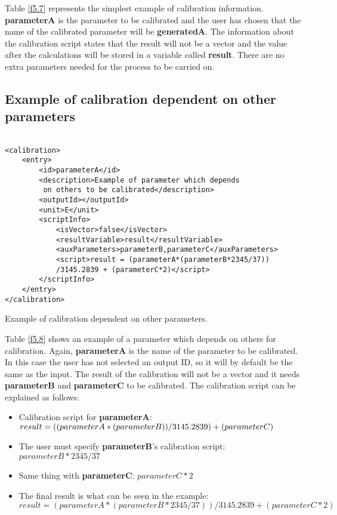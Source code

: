 Table \ref{f5.7} represents the simplest example of calibration information. \textbf{parameterA} is the parameter to be calibrated and the user has chosen that the name of the calibrated parameter will be \textbf{generatedA}. The information about the calibration script states that the result will not be a vector and the value after the calculations will be stored in a variable called \textbf{result}. There are no extra parameters needed for the process to be carried on.

\subsection{Example of calibration dependent on other parameters}

\begin{table}[H]
\lstset{language=XML}
\begin{lstlisting}

<calibration>
	<entry>
		<id>parameterA</id>
		<description>Example of parameter which depends
		 on others to be calibrated</description>
		<outputId></outputId>
		<unit>E</unit>
		<scriptInfo>
			<isVector>false</isVector>
			<resultVariable>result</resultVariable>
			<auxParameters>parameterB,parameterC</auxParameters>
			<script>result = (parameterA*(parameterB*2345/37))
			/3145.2839 + (parameterC*2)</script>
		</scriptInfo>
	</entry>
</calibration>
\end{lstlisting}
\caption{Example of calibration dependent on other parameters.}
\label{Table5.8}
\end{table}

Table \ref{f5.8} shows an example of a parameter which depends on others for calibration. Again, \textbf{parameterA} is the name of the parameter to be calibrated. In this case the user has not selected an output ID, so it will by default be the same as the input. The result of the calibration will not be a vector and it needs \textbf{parameterB} and \textbf{parameterC} to be calibrated. The calibration script can be explained as follows:
\begin{itemize}
\item Calibration script for \textbf{parameterA}: $result = ((parameterA*(parameterB))\\			/3145.2839) + (parameterC)$
\item The user must specify \textbf{parameterB}'s calibration script: $parameterB*2345/37$
\item Same thing with \textbf{parameterC}: $parameterC*2$
\item The final result is what can be seen in the example: $result = (parameterA*(parameterB*2345/37))/3145.2839 + (parameterC*2)$
\end{itemize}
\pagebreak

